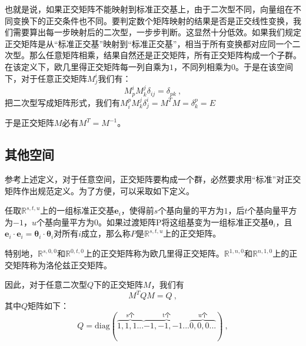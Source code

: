 也就是说，如果正交矩阵不能映射到标准正交基上，由于二次型不同，向量组在不同变换下的正交条件也不同。要判定数个矩阵映射的结果是否是正交线性变换，我们需要算出每一步映射后的二次型，一步步判断。这显然十分低效。如果我们规定正交矩阵是从“标准正交基”映射到“标准正交基”，相当于所有变换都对应同一个二次型。那么任意矩阵相乘，结果自然还是正交矩阵，所有正交矩阵构成一个子群。
在该定义下，欧几里得正交矩阵每一列自乘为$1$，不同列相乘为$0$。于是在该空间下，对于任意正交矩阵$M^i_j$我们有：
\begin{equation}
M^i_pM^j_k\delta_{ij}=\delta_{pk}~,
\end{equation}
把二次型写成矩阵形式，我们有$M^p_iM^j_k\delta^i_j=M^T M=\delta^p_k=E$

于是正交矩阵$M$必有$M^T=M^{-1}$。
\subsection{其他空间}
参考上述定义，对于任意空间，正交矩阵要构成一个群，必然要求用“标准”对正交矩阵作出规范定义。为了方便，可以采取如下定义。
\begin{definition}{}
任取$\mathbb R^{s,t,u}$上的一组标准正交基${\boldsymbol{e}_i}$，使得前$s$个基向量的平方为$1$，后$t$个基向量平方为$-1$，$u$个基向量平方为$0$。如果过渡矩阵P将这组基变为一组标准正交基${\boldsymbol{\theta}_i}$，且$\boldsymbol{e}_i\cdot \boldsymbol{e}_i=\boldsymbol{\theta}_i\cdot\boldsymbol{\theta}_i$对所有$i$成立，那么称$P$是$\mathbb R^{s,t,u}$上的正交矩阵。

特别地，$\mathbb R^{s,0,0}$和$\mathbb R^{0,t,0}$上的正交矩阵称为欧几里得正交矩阵。$\mathbb R^{1,n,0}$和$\mathbb R^{n,1,0}$上的正交矩阵称为洛伦兹正交矩阵。
\end{definition}
因此，对于任意二次型$Q$下的正交矩阵$M$，我们有
\begin{equation}
M^TQM=Q~,
\end{equation}
其中$Q$矩阵如下：
\begin{equation}
Q=\mathrm{diag}(\overbrace{1,1,1...}^{\text{s个}}\overbrace{-1,-1,-1...}^{\text{t个}}\overbrace{0,0,0...}^{\text{u个}})~,
\end{equation}